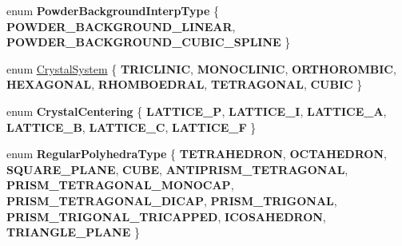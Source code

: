 \begin{DoxyCompactItemize}
\mbox{\label{namespace_obj_cryst_a6bce277353aca675f4ed8dbd61576cdc}} 
enum {\bfseries Powder\+Background\+Interp\+Type} \{ {\bfseries P\+O\+W\+D\+E\+R\+\_\+\+B\+A\+C\+K\+G\+R\+O\+U\+N\+D\+\_\+\+L\+I\+N\+E\+AR}, 
{\bfseries P\+O\+W\+D\+E\+R\+\_\+\+B\+A\+C\+K\+G\+R\+O\+U\+N\+D\+\_\+\+C\+U\+B\+I\+C\+\_\+\+S\+P\+L\+I\+NE}
 \}
\item 
enum \mbox{\hyperlink{namespace_obj_cryst_a9cd1d00f4ec9f0e75564ee151f47dd83}{Crystal\+System}} \{ \newline
{\bfseries T\+R\+I\+C\+L\+I\+N\+IC}, 
{\bfseries M\+O\+N\+O\+C\+L\+I\+N\+IC}, 
{\bfseries O\+R\+T\+H\+O\+R\+O\+M\+B\+IC}, 
{\bfseries H\+E\+X\+A\+G\+O\+N\+AL}, 
\newline
{\bfseries R\+H\+O\+M\+B\+O\+E\+D\+R\+AL}, 
{\bfseries T\+E\+T\+R\+A\+G\+O\+N\+AL}, 
{\bfseries C\+U\+B\+IC}
 \}
\item 
\mbox{\label{namespace_obj_cryst_a7cc8f706a2aab2fc52a0299309bd5656}} 
enum {\bfseries Crystal\+Centering} \{ \newline
{\bfseries L\+A\+T\+T\+I\+C\+E\+\_\+P}, 
{\bfseries L\+A\+T\+T\+I\+C\+E\+\_\+I}, 
{\bfseries L\+A\+T\+T\+I\+C\+E\+\_\+A}, 
{\bfseries L\+A\+T\+T\+I\+C\+E\+\_\+B}, 
\newline
{\bfseries L\+A\+T\+T\+I\+C\+E\+\_\+C}, 
{\bfseries L\+A\+T\+T\+I\+C\+E\+\_\+F}
 \}
\item 
\mbox{\label{namespace_obj_cryst_a5df2c3e21e25a0a441d4e17884e500f7}} 
enum {\bfseries Regular\+Polyhedra\+Type} \{ \newline
{\bfseries T\+E\+T\+R\+A\+H\+E\+D\+R\+ON}, 
{\bfseries O\+C\+T\+A\+H\+E\+D\+R\+ON}, 
{\bfseries S\+Q\+U\+A\+R\+E\+\_\+\+P\+L\+A\+NE}, 
{\bfseries C\+U\+BE}, 
\newline
{\bfseries A\+N\+T\+I\+P\+R\+I\+S\+M\+\_\+\+T\+E\+T\+R\+A\+G\+O\+N\+AL}, 
{\bfseries P\+R\+I\+S\+M\+\_\+\+T\+E\+T\+R\+A\+G\+O\+N\+A\+L\+\_\+\+M\+O\+N\+O\+C\+AP}, 
{\bfseries P\+R\+I\+S\+M\+\_\+\+T\+E\+T\+R\+A\+G\+O\+N\+A\+L\+\_\+\+D\+I\+C\+AP}, 
{\bfseries P\+R\+I\+S\+M\+\_\+\+T\+R\+I\+G\+O\+N\+AL}, 
\newline
{\bfseries P\+R\+I\+S\+M\+\_\+\+T\+R\+I\+G\+O\+N\+A\+L\+\_\+\+T\+R\+I\+C\+A\+P\+P\+ED}, 
{\bfseries I\+C\+O\+S\+A\+H\+E\+D\+R\+ON}, 
{\bfseries T\+R\+I\+A\+N\+G\+L\+E\+\_\+\+P\+L\+A\+NE}
 \}
\end{DoxyCompactItemize}

